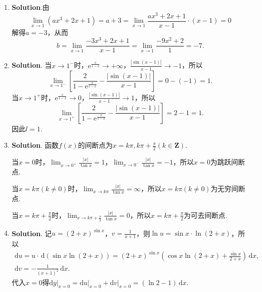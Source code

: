 \documentclass[../main.tex]{subfiles}
\begin{document}
\begin{enumerate}
    \item \textbf{Solution}.由
          \[
              \lim_{x\to1}(ax^{3}+2x+1)=a+3=\lim_{x\to1}\frac{ax^{3}+2x+1}{x-1}\cdot(x-
              1)=0
          \]
          解得$a=-3$，从而
          \[
              b=\lim_{x\to1}\frac{-3x^{3}+2x+1}{x-1}=\lim_{x\to1}\frac{-9x^{2}+2}{1}= -
              7.
          \]

    \item \textbf{Solution}. 当$x\to1^{-}$时，$\mathrm{e}^{\frac{x}{1-x}}\to+\infty$，$\frac{|\sin(x-1)|}{x-1}
              \to-1$，所以
          \[
              \lim_{x\to1^-}\left[\frac{2}{1-\mathrm{e}^{\frac{x}{1-x}}}-\frac{|\sin(x-1)|}{x-1}
                  \right]= 0-(-1)=1.
          \]
          当$x\to1^{+}$时，$\mathrm{e}^{\frac{x}{1-x}}\to0$，$\frac{|\sin(x-1)|}{x-1}
              \to1$，所以
          \[
              \lim_{x\to1^+}\left[\frac{2}{1-\mathrm{e}^{\frac{x}{1-x}}}-\frac{|\sin(x-1)|}{x-1}
                  \right]= 2-1=1.
          \]
          因此$l=1$.

    \item \textbf{Solution}. 函数$f(x)$的间断点为$x=k\pi,k\pi+\frac{\pi}{2}(k\in\mathbf{Z}
              )$.

          当$x=0$时，$\lim_{x\to0^+}\frac{|x|}{\tan x}=1$，$\lim_{x\to0^-}\frac{|x|}{\tan
                  x}=-1$，所以$x=0$为跳跃间断点.

          当$x=k\pi(k\neq0)$时，$\lim_{x\to k\pi}\frac{|x|}{\tan x}=\infty$，所以$x=k
              \pi(k\neq0)$为无穷间断点.

          当$x=k\pi+\frac{\pi}{2}$时，$\lim_{x\to k\pi+\frac{\pi}{2}}\frac{|x|}{\tan
                  x}=0$，所以$x=k\pi+\frac{\pi}{2}$为可去间断点.

    \item \textbf{Solution}. 记$u=(2+x)^{\sin x}$，$v=\frac{1}{x+1}$，则$\ln u = \sin
              x\cdot\ln(2+x)$，所以
          \[
              \begin{gathered}
                  \mathrm{d}u =u\cdot\,\mathrm{d}\left(\sin x\ln(2+x)\right)=(2+x)^{\sin x}\left(\cos
                  x\ln(2+x)+\frac{\sin x}{2+x}\right)\,\mathrm{d}x,\\
                  \mathrm{d}v =-\frac{1}{(x+1)^{2}}\,\mathrm{d}x.
              \end{gathered}
          \]
          代入$x=0$得$\left.\mathrm{d}y\right|_{x=0}=\left.\mathrm{d}u\right|_{x=0}+\left
              .\mathrm{d}v\right|_{x=0}=(\ln2-1)\,\mathrm{d}x$.


\end{enumerate}
\end{document}
